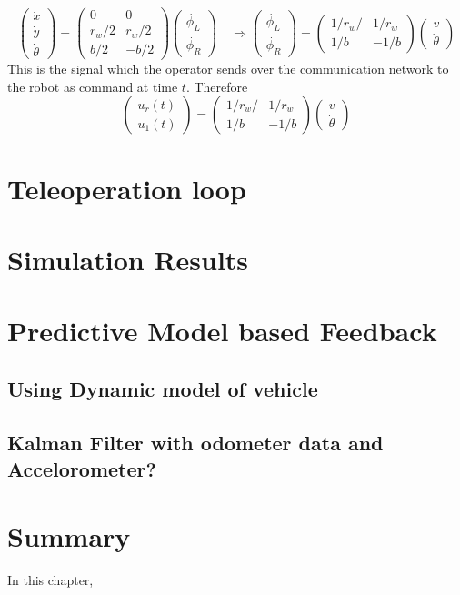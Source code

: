 \begin{equation}
\begin{pmatrix}
\dot{x}\\
\dot{y}\\
\dot{\theta}
\end{pmatrix}
=
\begin{pmatrix}
0 & 0 \\
r_w/2 & r_w/2 \\
b/2 & -b/2
\end{pmatrix}
\begin{pmatrix}
\dot{\phi_L}\\
\dot{\phi_R}
\end{pmatrix}
\quad \Rightarrow 
\begin{pmatrix}
\dot{\phi_L}\\
\dot{\phi_R}
\end{pmatrix} =
\begin{pmatrix}
1/r_w/ & 1/r_w \\
1/b & -1/b
\end{pmatrix}
\begin{pmatrix}
v\\
\dot{\theta}
\end{pmatrix}
\end{equation}
This is the signal which the operator sends over the  communication network to the robot as command at time $t$. Therefore
\begin{equation}
\begin{pmatrix}
u_r(t)\\
u_1(t)
\end{pmatrix}
=
\begin{pmatrix}
1/r_w/ & 1/r_w \\
1/b & -1/b
\end{pmatrix}
\begin{pmatrix}
v\\
\dot{\theta}
\end{pmatrix}
\end{equation}  
\section{Teleoperation loop}
\section{Simulation Results }
\section{Predictive Model based Feedback}
\subsection{Using Dynamic model of vehicle}
\subsection{Kalman Filter with odometer data and Accelorometer?}


\section{Summary}
In this chapter, 